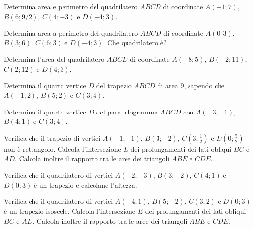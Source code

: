 \begin{multicols}{2}
\begin{esercizio}
\label{ese:7.91}
Determina area e perimetro del quadrilatero \(ABCD\) di coordinate 
\(A(-1;7)\), \(B(6;9/2)\), \(C(4;-3)\) e \(D(-4;3)\).
\end{esercizio}

\begin{esercizio}
\label{ese:7.92}
Determina area a perimetro del quadrilatero \(ABCD\) di coordinate 
\(A(0;3)\), \(B(3;6)\), \(C(6;3)\) e \(D(-4;3)\). Che quadrilatero è?
\end{esercizio}

\begin{esercizio}
\label{ese:7.93}
Determina l'area del quadrilatero \(ABCD\) di coordinate \(A(-8;5)\), 
\(B(-2;11)\), \(C(2;12)\) e \(D(4;3)\).
\end{esercizio}

\begin{esercizio}
\label{ese:7.94}
Determina il quarto vertice \(D\) del trapezio \(ABCD\) di area \(9\), 
sapendo che \(A(-1;2)\), \(B(5;2)\) e \(C(3;4)\).
\end{esercizio}

\begin{esercizio}
\label{ese:7.95}
Determina il quarto vertice \(D\) del parallelogramma \(ABCD\) con 
\(A(-3;-1)\), \(B(4;1)\) e \(C(3;4)\).
\end{esercizio}

\begin{esercizio}
\label{ese:7.96}
Verifica che il trapezio di vertici \(A(-1;-1)\), \(B(3;-2)\), 
\(C\left(3;\frac{1}{2}\right)\) e \(D\left(0;\frac{5}{2}\right)\) non è 
rettangolo. Calcola l'intersezione \(E\) dei prolungamenti dei lati 
obliqui \(BC\) e \(AD\). Calcola inoltre il rapporto tra le aree dei 
triangoli \(ABE\) e \(CDE\).
\end{esercizio}

\begin{esercizio}
\label{ese:7.97}
Verifica che il quadrilatero di vertici \(A(-2;-3)\), \(B(3;-2)\), 
\(C(4;1)\) e \(D(0;3)\) è un trapezio e calcolane l'altezza.
\end{esercizio}

\begin{esercizio}
\label{ese:7.98}
Verifica che il quadrilatero di vertici \(A(-4;1)\), \(B(5;-2)\), 
\(C(3;2)\) e \(D(0;3)\) è un trapezio isoscele. Calcola l'intersezione \(E\) 
dei prolungamenti dei lati obliqui \(BC\) e \(AD\). Calcola inoltre il 
rapporto tra le aree dei triangoli \(ABE\) e \(CDE\).
\end{esercizio}


\end{multicols}
